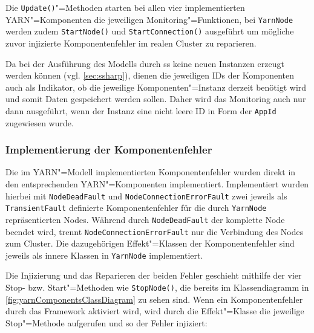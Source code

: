 Die \texttt{Update()}"=Methoden starten bei allen vier implementierten \ac{YARN}"=Komponenten die jeweiligen Monitoring"=Funktionen, bei \texttt{YarnNode} werden zudem \texttt{StartNode()} und \texttt{StartConnection()} ausgeführt um mögliche zuvor injizierte Komponentenfehler im realen Cluster zu reparieren.

Da bei der Ausführung des Modells durch \ac{ss} keine neuen Instanzen erzeugt werden können (vgl. \cref{sec:ssharp}), dienen die jeweiligen IDs der Komponenten auch als Indikator, ob die jeweilige Komponenten"=Instanz derzeit benötigt wird und somit Daten gespeichert werden sollen.
Daher wird das Monitoring auch nur dann ausgeführt, wenn der Instanz eine nicht leere ID \zB in Form der \texttt{AppId} zugewiesen wurde.

\subsubsection{Implementierung der Komponentenfehler}
\label{subsubsec:yarnComponentFaults}

Die im \ac{YARN}"=Modell implementierten Komponentenfehler wurden direkt in den entsprechenden \ac{YARN}"=Komponenten implementiert.
Implementiert wurden hierbei mit \texttt{NodeDeadFault} und \texttt{NodeConnectionErrorFault} zwei jeweils als \texttt{TransientFault} definierte Komponentenfehler für die durch \texttt{YarnNode} repräsentierten Nodes.
Während durch \texttt{NodeDeadFault} der komplette Node beendet wird, trennt \texttt{NodeConnectionErrorFault} nur die Verbindung des Nodes zum Cluster.
Die dazugehörigen Effekt"=Klassen der Komponentenfehler sind jeweils als innere Klassen in \texttt{YarnNode} implementiert.

Die Injizierung und das Reparieren der beiden Fehler geschieht mithilfe der vier Stop- bzw. Start"=Methoden wie \zB \texttt{StopNode()}, die bereits im Klassendiagramm in \cref{fig:yarnComponentsClassDiagram} zu sehen sind.
Wenn ein Komponentenfehler durch das Framework aktiviert wird, wird durch die Effekt"=Klasse die jeweilige Stop"=Methode aufgerufen und so der Fehler injiziert:

